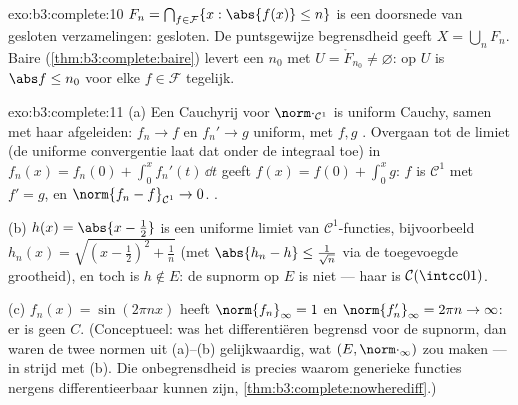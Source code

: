 \begin{solution}{exo:b3:complete:10}
$F_n = \bigcap_{f \in \mathcal F}\{x : \abs{f(x)} \leq n\}$ is een
doorsnede van gesloten verzamelingen: gesloten. De puntsgewijze
begrensdheid geeft $X = \bigcup_n F_n$. Baire
(\cref{thm:b3:complete:baire}) levert een $n_0$ met $U =
\mathring F_{n_0} \neq \varnothing$: op $U$ is $\abs f \leq n_0$
voor elke $f \in \mathcal F$ tegelijk.
\end{solution}

\begin{solution}{exo:b3:complete:11}
(a) Een Cauchyrij voor $\norm\cdot_{\mathcal C^1}$ is uniform
Cauchy, samen met haar afgeleiden: $f_n \to f$ en $f_n' \to g$
uniform, met $f, g$ . Overgaan tot de limiet (de uniforme
convergentie laat dat onder de integraal toe) in $f_n(x) = f_n(0)
+ \int_0^xf_n'(t)\,\dd t$ geeft $f(x) = f(0) + \int_0^xg$: $f$ is
$\mathcal C^1$ met $f' = g$, en $\norm{f_n - f}_{\mathcal C^1} \to
0$. .

(b) $h(x) = \abs{x - \frac12}$ is een uniforme limiet van
$\mathcal C^1$-functies, bijvoorbeeld $h_n(x) = \sqrt{(x -
\frac12)^2 + \frac1n}$ (met $\abs{h_n - h} \leq \frac1{\sqrt n}$
via de toegevoegde grootheid), en toch is $h \notin E$: de supnorm
op $E$ is niet  --- haar  is $\mathcal
C(\intcc01)$.

(c) $f_n(x) = \sin(2\pi nx)$ heeft $\norm{f_n}_\infty = 1$ en
$\norm{f_n'}_\infty = 2\pi n \to \infty$: er is geen $C$.
(Conceptueel: was het differentiëren begrensd voor de supnorm, dan
waren de twee normen uit (a)--(b) gelijkwaardig, wat $(E,
\norm\cdot_\infty)$  zou maken --- in strijd met (b). Die
onbegrensdheid is precies waarom generieke  functies
nergens differentieerbaar kunnen zijn,
\cref{thm:b3:complete:nowherediff}.)
\end{solution}

